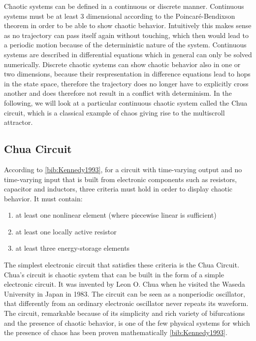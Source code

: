 \documentclass[main]{subfiles}
\begin{document}
Chaotic systems can be defined in a continuous or discrete manner. Continuous systems must be at least 3 dimensional according to the Poincaré-Bendixson theorem in order to be able to show chaotic behavior. Intuitively this makes sense as no trajectory can pass itself again without touching, which then would lead to a periodic motion because of the deterministic nature of the system. Continuous systems are described in differential equations which in general can only be solved numerically. Discrete chaotic systems can show chaotic behavior also in one or two dimensions, because their respresentation in difference equations lead to hops in the state space, therefore the trajectory does no longer have to explicitly cross another and does therefore not result in a conflict with determinism. In the following, we will look at a particular continuous chaotic system called the Chua circuit, which is a classical example of chaos giving rise to the multiscroll attractor.

\subsection{Chua Circuit}
\label{subsec:chua-circuit}

According to \ref{bib:Kennedy1993}, for a circuit with time-varying output and no time-varying input that is built from electronic components such as resistors, capacitor and inductors, three criteria must hold in order to display chaotic behavior. It must contain:
  \begin{enumerate}
  \item at least one nonlinear element (where piecewise linear is sufficient)
  \item at least one locally active resistor
  \item at least three energy-storage elements
  \end{enumerate}
  
The simplest electronic circuit that satisfies these criteria is the Chua Circuit. Chua's circuit is chaotic system that can be built in the form of a simple electronic circuit. It was invented by Leon O. Chua when he visited the Waseda University in Japan in 1983. The circuit can be seen as a nonperiodic oscillator, that differently from an ordinary electronic oscillator never repeats its waveform. The circuit, remarkable because of its simplicity and rich variety of bifurcations and the presence of chaotic behavior, is one of the few physical systems for which the presence of chaos has been proven mathematically \ref{bib:Kennedy1993}.
\end{document}
